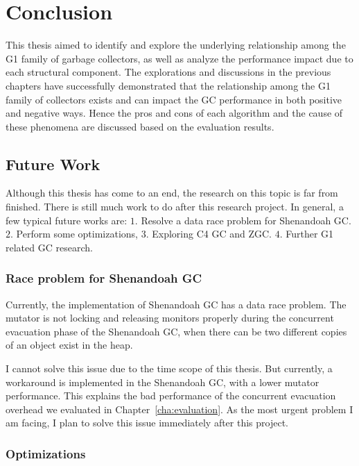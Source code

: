\chapter{Conclusion}
\label{cha:conc}

This thesis aimed to identify and explore the underlying relationship among the
G1 family of garbage collectors, as well as analyze the performance impact due to
each structural component.
The explorations and discussions in the previous chapters have successfully demonstrated
that the relationship among the G1 family of collectors exists and can impact the GC
performance in both positive and negative ways.
Hence the pros and cons of each algorithm and the cause of these phenomena
are discussed based on the evaluation results.

\section{Future Work}
\label{sec:future}

Although this thesis has come to an end, the research on this topic is far from finished.
There is still much work to do after this research project.
In general, a few typical future works are:
$1.$ Resolve a data race problem for Shenandoah GC.
$2.$ Perform some optimizations,
$3.$ Exploring C4 GC and ZGC.
$4.$ Further G1 related GC research.

\subsection{Race problem for Shenandoah GC}

Currently, the implementation of Shenandoah GC has a data race problem.
The mutator is not locking and releasing monitors
properly during the concurrent evacuation phase of the Shenandoah GC, when there can be
two different copies of an object exist in the heap.

I cannot solve this issue due to the time scope of this thesis.
But currently, a workaround is implemented in the Shenandoah GC, with a lower mutator performance.
This explains the bad performance of the concurrent evacuation overhead we evaluated in Chapter~\ref{cha:evaluation}.
As the most urgent problem I am facing, I plan to solve this issue immediately after
this project.

\subsection{Optimizations}

